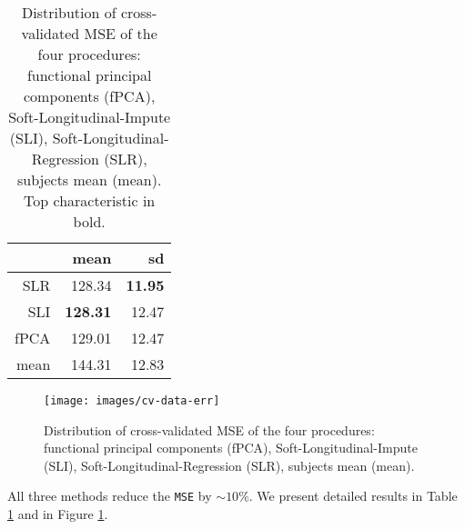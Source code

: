 \documentclass[preprint]{imsart}
\numberwithin{equation}{section}
\theoremstyle{plain}
\DeclareMathOperator*{\diag}{diag}
\begin{document}
\begin{table}[ht]
\centering
\begin{tabular}{rrr}
  \hline
 & mean & sd \\ 
  \hline
  SLR & 128.34 & \textbf{11.95} \\ 
  SLI & \textbf{128.31} & 12.47 \\ 
  fPCA & 129.01 & 12.47 \\ 
  mean & 144.31 & 12.83 \\ 
   \hline
\end{tabular}\label{tbl:data-res}
\caption{Distribution of cross-validated MSE of the four procedures: functional principal components (fPCA), Soft-Longitudinal-Impute (SLI), Soft-Longitudinal-Regression (SLR), subjects mean (mean). Top characteristic in bold.}
\end{table}

\begin{figure}[h!]
  \texttt{[image: images/cv-data-err]}
  \caption{Distribution of cross-validated MSE of the four procedures: functional principal components (fPCA), Soft-Longitudinal-Impute (SLI), Soft-Longitudinal-Regression (SLR), subjects mean (mean).}
  \label{fig:Boxplots}
\end{figure}

All three methods reduce the \verb|MSE| by $\sim 10\%$. We present detailed results in Table \ref{tbl:data-res} and in Figure \ref{fig:Boxplots}. 




\end{document}
